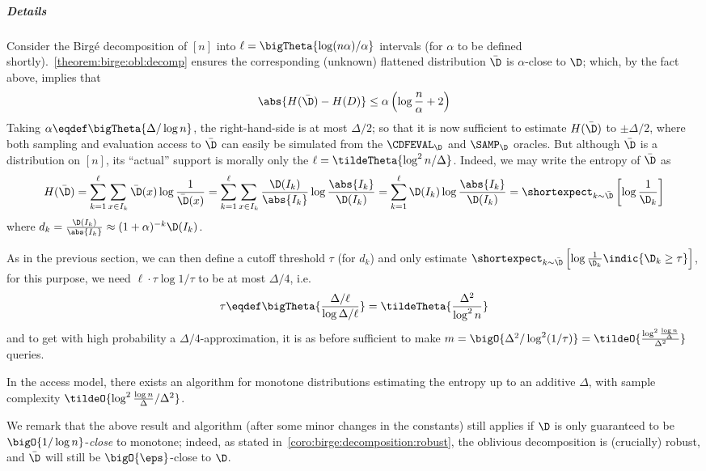 \subparagraph{Details} Consider the Birg\'e decomposition of $[n]$ into $\ell=\bigTheta{\log(n\alpha)/\alpha}$ intervals (for $\alpha$ to be defined shortly).~\cref{theorem:birge:obl:decomp} ensures the corresponding (unknown) flattened distribution $\bar{\D}$ is $\alpha$-close to $\D$; which, by the fact above, implies that
\begin{equation}
  \abs{ H(\bar{\D}) - H(D) } \leq \alpha\left(\log\frac{n}{\alpha} + 2\right)
\end{equation}
Taking $\alpha\eqdef\bigTheta{\Delta/\log n}$, the right-hand-side is at most $\Delta/2$; so that it is now sufficient to estimate $H(\bar{\D})$ to $\pm\Delta/2$, where both sampling and evaluation access to $\bar{\D}$ can easily be simulated from the $\CDFEVAL_{\D}$ and $\SAMP_{\D}$ oracles. But although $\bar{\D}$ is a distribution on $[n]$, its ``actual'' support is morally only the $\ell=\tildeTheta{\log^2 n/\Delta}$. Indeed, we may write the entropy of $\bar{\D}$ as
\begin{align*}
  H(\bar{\D}) = \sum_{k=1}^\ell \sum_{x\in I_k} \bar{\D}(x) \log \frac{1}{\bar{\D}(x)} = \sum_{k=1}^\ell \sum_{x\in I_k} \frac{\D(I_k)}{\abs{I_k}} \log \frac{\abs{I_k}}{\D(I_k)}
             = \sum_{k=1}^\ell \D(I_k) \log \frac{\abs{I_k}}{\D(I_k)} = \shortexpect_{k\sim \bar{\D}}\left[ \log \frac{1}{\D_k} \right]
\end{align*}
where $d_k=\frac{\D(I_k)}{\abs{I_k}}\approx (1+\alpha)^{-k} \D(I_k)$.

  As in the previous section, we can then define a cutoff threshold $\tau$ (for $d_k$) and only estimate $\shortexpect_{k\sim \bar{\D}}\left[ \log \frac{1}{\D_k}\indic{\D_k\geq\tau} \right]$, for this purpose, we need $\ell\cdot\tau\log 1/\tau$ to be at most $\Delta/4$, i.e.
  \[
    \tau\eqdef \bigTheta{ \frac{ \Delta/\ell }{ \log\Delta/\ell } } = \tildeTheta{ \frac{\Delta^2}{\log^2 n}  }
  \]
  and to get with high probability a $\Delta/4$-approximation, it is as before sufficient to make $m=\bigO{ \Delta^2/\log^2(1/\tau) } = \tildeO{\frac{\log^2\frac{\log n}{\Delta}}{\Delta^2}}$ queries.

\begin{theorem}\label{theorem:entropy:estimation:additive:monotone}
In the \cdfsamp access model, there exists an algorithm for monotone distributions estimating the entropy up to an additive $\Delta$, with sample complexity $\tildeO{{\log^2\frac{\log n}{\Delta}}/{\Delta^2}}$.
\end{theorem}

\begin{remark}\label{remark:entropy:estimation:additive:monotone:close}
We remark that the above result and algorithm (after some minor changes in the constants) still applies if $\D$ is only guaranteed to be $\bigO{1/\log n}$-\emph{close} to monotone; indeed, as stated in~\cref{coro:birge:decomposition:robust}, the oblivious decomposition is (crucially) {robust}, and $\bar{\D}$ will still be $\bigO{\eps}$-close to $\D$.
\end{remark}
 
